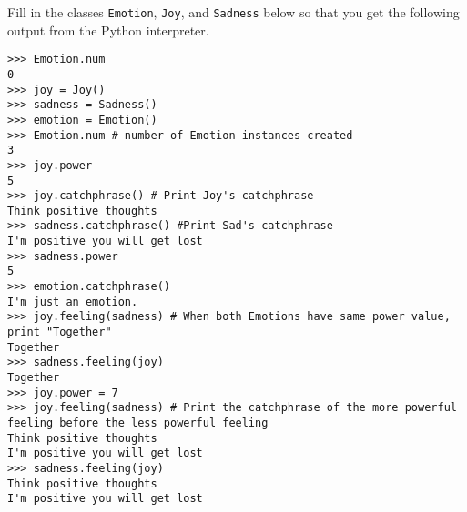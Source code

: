 \question
Fill in the classes \texttt{Emotion}, \texttt{Joy}, and \texttt{Sadness} below so that you get the following output from the Python interpreter.

\begin{blocksection}
\begin{lstlisting}
>>> Emotion.num
0
>>> joy = Joy()
>>> sadness = Sadness()
>>> emotion = Emotion()
>>> Emotion.num # number of Emotion instances created
3
>>> joy.power
5
>>> joy.catchphrase() # Print Joy's catchphrase
Think positive thoughts
>>> sadness.catchphrase() #Print Sad's catchphrase
I'm positive you will get lost
>>> sadness.power
5
>>> emotion.catchphrase()
I'm just an emotion.
>>> joy.feeling(sadness) # When both Emotions have same power value, print "Together"
Together
>>> sadness.feeling(joy)
Together
>>> joy.power = 7
>>> joy.feeling(sadness) # Print the catchphrase of the more powerful feeling before the less powerful feeling
Think positive thoughts
I'm positive you will get lost
>>> sadness.feeling(joy)
Think positive thoughts 
I'm positive you will get lost
\end{lstlisting}
\end{blocksection}

